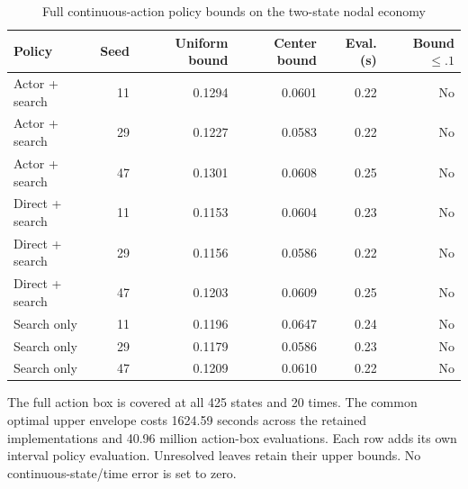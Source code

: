 \begin{table}[htbp]\centering
\caption{Full continuous-action policy bounds on the two-state nodal economy}
\begin{small}\begin{tabular}{lrrrrr}
\toprule
Policy & Seed & Uniform bound & Center bound & Eval. (s) & Bound $\leq .1$ \\
\midrule
Actor + search & 11 & 0.1294 & 0.0601 & 0.22 & No \\
Actor + search & 29 & 0.1227 & 0.0583 & 0.22 & No \\
Actor + search & 47 & 0.1301 & 0.0608 & 0.25 & No \\
Direct + search & 11 & 0.1153 & 0.0604 & 0.23 & No \\
Direct + search & 29 & 0.1156 & 0.0586 & 0.22 & No \\
Direct + search & 47 & 0.1203 & 0.0609 & 0.25 & No \\
Search only & 11 & 0.1196 & 0.0647 & 0.24 & No \\
Search only & 29 & 0.1179 & 0.0586 & 0.23 & No \\
Search only & 47 & 0.1209 & 0.0610 & 0.22 & No \\
\bottomrule\end{tabular}\end{small}
\par\smallskip\begin{minipage}{.96\linewidth}\footnotesize The full action box is covered at all 425 states and 20 times. The common optimal upper envelope costs 1624.59 seconds across the retained implementations and 40.96 million action-box evaluations. Each row adds its own interval policy evaluation. Unresolved leaves retain their upper bounds. No continuous-state/time error is set to zero.\end{minipage}
\end{table}
